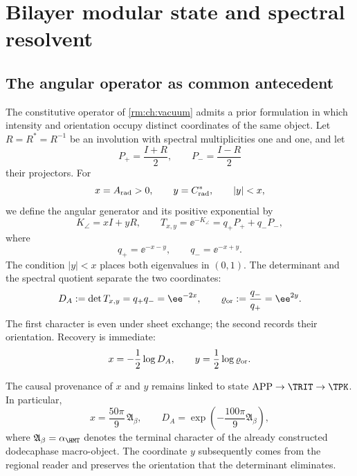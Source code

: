 \chapter{Bilayer modular state and spectral resolvent}
\label{rm:chap:estado-modular-resolvente}

\section{The angular operator as common antecedent}

The constitutive operator of \cref{rm:ch:vacuum} admits a prior formulation
in which intensity and orientation occupy distinct coordinates of
the same object. Let \(R=R^*=R^{-1}\) be an involution with spectral multiplicities
one and one, and let
\begin{equation}
 P_+=\frac{I+R}{2},
 \qquad
 P_-=\frac{I-R}{2}
 \label{rm:eq:modular-projectors}
\end{equation}
their projectors. For
\begin{equation}
 x=A_{\rm rad}>0,
 \qquad
 y=C^*_{\rm rad},
 \qquad
 |y|<x,
 \label{rm:eq:modular-domain}
\end{equation}
we define the angular generator and its positive exponential by
\begin{equation}
 K_{\angle}=xI+yR,
 \qquad
 T_{x,y}=\ee^{-K_{\angle}}
 =q_+P_++q_-P_-,
 \label{rm:eq:modular-angular-operator}
\end{equation}
where
\begin{equation}
 q_+=\ee^{-x-y},
 \qquad
 q_-=\ee^{-x+y}.
 \label{rm:eq:modular-qpm}
\end{equation}
The condition \(|y|<x\) places both eigenvalues in \((0,1)\). The
determinant and the spectral quotient separate the two coordinates:
\begin{equation}
 D_A:=\det T_{x,y}=q_+q_-=\ee^{-2x},
 \qquad
 \varrho_{\rm or}:=\frac{q_-}{q_+}=\ee^{2y}.
 \label{rm:eq:modular-determinant-ratio}
\end{equation}
The first character is even under sheet exchange; the second records their orientation. Recovery is immediate:
\begin{equation}
 x=-\frac12\log D_A,
 \qquad
 y=\frac12\log\varrho_{\rm or}.
 \label{rm:eq:modular-recover-xy}
\end{equation}

The causal provenance of \(x\) and \(y\) remains linked to
state \(\mathrm{APP}\to\TRIT\to\TPK\). In particular,
\begin{equation}
 x=\frac{50\pi}{9}\,\mathfrak A_\beta,
 \qquad
 D_A=\exp\!\left(-\frac{100\pi}{9}\mathfrak A_\beta\right),
 \label{rm:eq:modular-alpha-determinant}
\end{equation}
where \(\mathfrak A_\beta=\alpha_{\HMT}\) denotes the terminal character of the
already constructed dodecaphase macro-object. The coordinate \(y\) subsequently comes
from the regional reader and preserves the orientation that the determinant eliminates.

